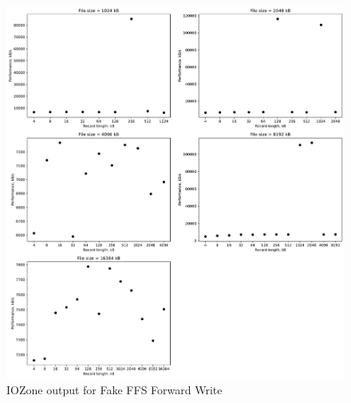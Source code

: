 \begin{figure}[!htb]
	\label{fig:app_bench_fffs_rnd_read}
	\begin{center}
		\includegraphics[width=1.0\textwidth]{figures/benchmarking/fake-ffs/Write.pdf}
	\end{center}
	\caption{IOZone output for Fake FFS Forward Write}
\end{figure}


